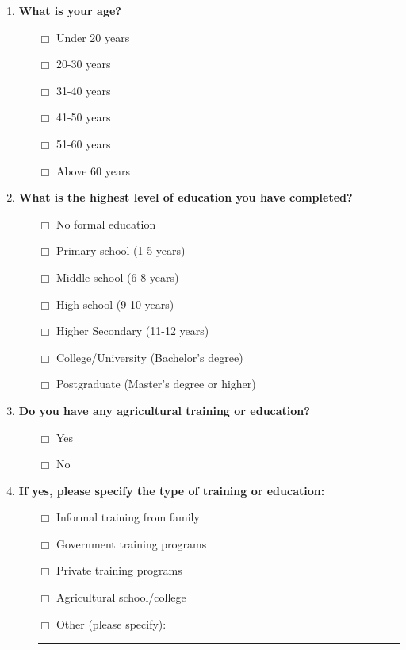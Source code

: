 \documentclass[12pt]{article}
\begin{document}
\begin{enumerate}[label=\arabic*.]
    \item \textbf{What is your age?}
    \begin{itemize}
        \item [$\Box$] Under 20 years
        \item [$\Box$] 20-30 years
        \item [$\Box$] 31-40 years
        \item [$\Box$] 41-50 years
        \item [$\Box$] 51-60 years
        \item [$\Box$] Above 60 years
    \end{itemize}
    \item \textbf{What is the highest level of education you have completed?}
    \begin{itemize}
        \item [$\Box$] No formal education
        \item [$\Box$] Primary school (1-5 years)
        \item [$\Box$] Middle school (6-8 years)
        \item [$\Box$] High school (9-10 years)
        \item [$\Box$] Higher Secondary (11-12 years)
        \item [$\Box$] College/University (Bachelor's degree)
        \item [$\Box$] Postgraduate (Master's degree or higher)
    \end{itemize}
    \item \textbf{Do you have any agricultural training or education?}
    \begin{itemize}
        \item [$\Box$] Yes
        \item [$\Box$] No
    \end{itemize}
    \item \textbf{If yes, please specify the type of training or education:}
    \begin{itemize}
        \item [$\Box$] Informal training from family
        \item [$\Box$] Government training programs
        \item [$\Box$] Private training programs
        \item [$\Box$] Agricultural school/college
        \item [$\Box$] Other (please specify): \rule{10cm}{0.4pt}
    \end{itemize}
\end{enumerate}
\end{document}
